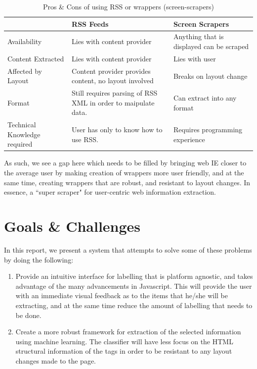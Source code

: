 \begin{table}[t]
\centering
\singlespacing
\small
\begin{tabular}{|p{3cm}|p{5cm}|p{5cm}|}
\hline
					&	RSS Feeds	&	Screen Scrapers \\
\hline
\hline
	Availability	&
	Lies with content provider &
	Anything that is displayed can be scraped \\
\hline
	Content Extracted &
	Lies with content provider &
	Lies with user \\
\hline
	Affected by Layout &
	Content provider provides content, no layout involved &
	Breaks on layout change \\
\hline
	Format &
	Still requires parsing of RSS XML in order to maipulate data. &
	Can extract into any format \\
\hline
	Technical Knowledge required &
	User has only to know how to use RSS. &
	Requires programming experience \\
	\hline
\end{tabular}
\caption{Pros \& Cons of using RSS or wrappers (screen-scrapers)}
\label{tab:template}
\end{table}

As such, we see a gap here which needs to be filled by bringing web IE closer to the average user by making creation of wrappers more user friendly, and at the same time, creating wrappers that are robust, and resistant to layout changes. In essence, a ``super scraper" for user-centric web information extraction.

\section{Goals \& Challenges}
In this report, we present a system that attempts to solve some of these problems by doing the following:
	\begin{enumerate}
		\item Provide an intuitive interface for labelling that is platform agnostic, and takes advantage of the many advancements in Javascript. This will provide the user with an immediate visual feedback as to the items that he/she will be extracting, and at the same time reduce the amount of labelling that needs to be done.
		\item Create a more robust framework for extraction of the selected information using machine learning. The classifier will have less focus on the HTML structural information of the tags in order to be resistant to any layout changes made to the page.
	\end{enumerate}
